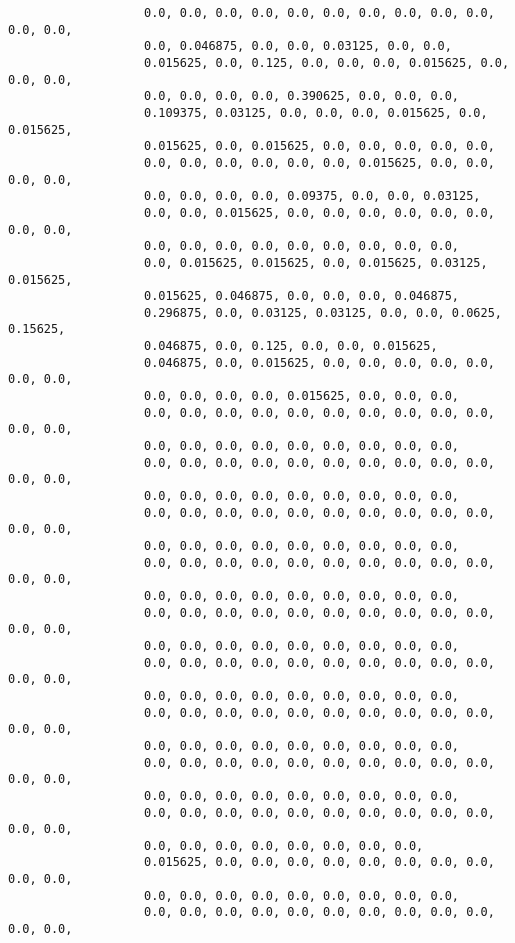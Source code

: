 \begin{verbatim}
                   0.0, 0.0, 0.0, 0.0, 0.0, 0.0, 0.0, 0.0, 0.0, 0.0, 0.0, 0.0,
                   0.0, 0.046875, 0.0, 0.0, 0.03125, 0.0, 0.0,
                   0.015625, 0.0, 0.125, 0.0, 0.0, 0.0, 0.015625, 0.0, 0.0, 0.0,
                   0.0, 0.0, 0.0, 0.0, 0.390625, 0.0, 0.0, 0.0,
                   0.109375, 0.03125, 0.0, 0.0, 0.0, 0.015625, 0.0, 0.015625,
                   0.015625, 0.0, 0.015625, 0.0, 0.0, 0.0, 0.0, 0.0,
                   0.0, 0.0, 0.0, 0.0, 0.0, 0.0, 0.015625, 0.0, 0.0, 0.0, 0.0,
                   0.0, 0.0, 0.0, 0.0, 0.09375, 0.0, 0.0, 0.03125,
                   0.0, 0.0, 0.015625, 0.0, 0.0, 0.0, 0.0, 0.0, 0.0, 0.0, 0.0,
                   0.0, 0.0, 0.0, 0.0, 0.0, 0.0, 0.0, 0.0, 0.0,
                   0.0, 0.015625, 0.015625, 0.0, 0.015625, 0.03125, 0.015625,
                   0.015625, 0.046875, 0.0, 0.0, 0.0, 0.046875,
                   0.296875, 0.0, 0.03125, 0.03125, 0.0, 0.0, 0.0625, 0.15625,
                   0.046875, 0.0, 0.125, 0.0, 0.0, 0.015625,
                   0.046875, 0.0, 0.015625, 0.0, 0.0, 0.0, 0.0, 0.0, 0.0, 0.0,
                   0.0, 0.0, 0.0, 0.0, 0.015625, 0.0, 0.0, 0.0,
                   0.0, 0.0, 0.0, 0.0, 0.0, 0.0, 0.0, 0.0, 0.0, 0.0, 0.0, 0.0,
                   0.0, 0.0, 0.0, 0.0, 0.0, 0.0, 0.0, 0.0, 0.0,
                   0.0, 0.0, 0.0, 0.0, 0.0, 0.0, 0.0, 0.0, 0.0, 0.0, 0.0, 0.0,
                   0.0, 0.0, 0.0, 0.0, 0.0, 0.0, 0.0, 0.0, 0.0,
                   0.0, 0.0, 0.0, 0.0, 0.0, 0.0, 0.0, 0.0, 0.0, 0.0, 0.0, 0.0,
                   0.0, 0.0, 0.0, 0.0, 0.0, 0.0, 0.0, 0.0, 0.0,
                   0.0, 0.0, 0.0, 0.0, 0.0, 0.0, 0.0, 0.0, 0.0, 0.0, 0.0, 0.0,
                   0.0, 0.0, 0.0, 0.0, 0.0, 0.0, 0.0, 0.0, 0.0,
                   0.0, 0.0, 0.0, 0.0, 0.0, 0.0, 0.0, 0.0, 0.0, 0.0, 0.0, 0.0,
                   0.0, 0.0, 0.0, 0.0, 0.0, 0.0, 0.0, 0.0, 0.0,
                   0.0, 0.0, 0.0, 0.0, 0.0, 0.0, 0.0, 0.0, 0.0, 0.0, 0.0, 0.0,
                   0.0, 0.0, 0.0, 0.0, 0.0, 0.0, 0.0, 0.0, 0.0,
                   0.0, 0.0, 0.0, 0.0, 0.0, 0.0, 0.0, 0.0, 0.0, 0.0, 0.0, 0.0,
                   0.0, 0.0, 0.0, 0.0, 0.0, 0.0, 0.0, 0.0, 0.0,
                   0.0, 0.0, 0.0, 0.0, 0.0, 0.0, 0.0, 0.0, 0.0, 0.0, 0.0, 0.0,
                   0.0, 0.0, 0.0, 0.0, 0.0, 0.0, 0.0, 0.0, 0.0,
                   0.0, 0.0, 0.0, 0.0, 0.0, 0.0, 0.0, 0.0, 0.0, 0.0, 0.0, 0.0,
                   0.0, 0.0, 0.0, 0.0, 0.0, 0.0, 0.0, 0.0,
                   0.015625, 0.0, 0.0, 0.0, 0.0, 0.0, 0.0, 0.0, 0.0, 0.0, 0.0,
                   0.0, 0.0, 0.0, 0.0, 0.0, 0.0, 0.0, 0.0, 0.0,
                   0.0, 0.0, 0.0, 0.0, 0.0, 0.0, 0.0, 0.0, 0.0, 0.0, 0.0, 0.0,

\end{verbatim}
